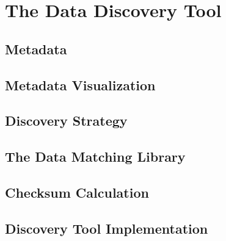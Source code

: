 \chapter{The Data Discovery Tool}\label{ch:ch2label}


\section{Metadata}\label{sec:metadata}



\section{Metadata Visualization}



\section{Discovery Strategy}



\section{The Data Matching Library}



\section{Checksum Calculation}



\section{Discovery Tool Implementation}

